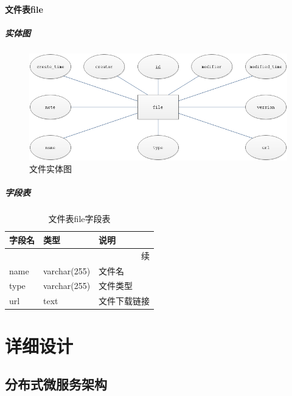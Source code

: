 \documentclass[titlepage,UTF8,linespread=1.5]{ctexart}
\begin{document}
\paragraph{文件表file}
\subparagraph{实体图}
\begin{figure}[H]
    \centering
    \includegraphics[width=140mm]{entity-file.png}
    \caption{文件实体图}
    \label{fig:entity-file}
\end{figure}
\subparagraph{字段表}
\begin{longtable}{|p{10em}|p{6em}|p{15em}|}
    \caption{文件表file字段表}\label{tab:table_file}     \\\hline
    字段名         & 类型         & 说明                 \\\hline
    \endfirsthead
    \multicolumn{3}{r}{{续\tablename\thetable{}}}        \\\hline
    \endhead
    name           & varchar(255) & 文件名               \\\hline
    type           & varchar(255) & 文件类型             \\\hline
    url            & text         & 文件下载链接         \\\hline
\end{longtable}\par
\clearpage

\section{详细设计}
\subsection{分布式微服务架构}
\end{document}

